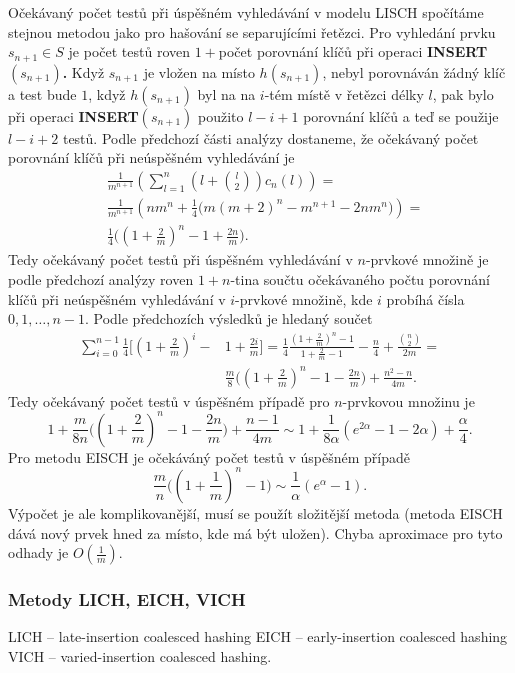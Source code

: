 \documentclass[a4paper,12pt]{article}
\begin{document}
Očekávaný počet testů při úspěšném 
vyhledávání v modelu LISCH spočítáme stejnou meto\-dou jako 
pro hašování se separujícími řetězci.  Pro vyhledání prvku 
$s_{n+1}\in S$ je počet testů roven $1+$počet porovnání 
klíčů při operaci {\bf INSERT$(s_{n+1})$.}  Když $
s_{n+1}$ je vložen 
na místo $h(s_{n+1})$, nebyl porovnáván žádný klíč a test bude $
1$, 
když $h(s_{n+1})$ byl na na $i$-tém místě v řetězci délky $
l$, pak bylo 
při operaci {\bf INSERT$(s_{n+1})$} použito $l-i+1$ porovnání klíčů 
a teď se použije $l-i+2$ testů. Podle předchozí části analýzy dostaneme, že očekávaný počet 
porovnání klíčů při neúspěšném vyhledávání je 
\begin{align*}&\frac 1{m^{n+1}}(\sum_{l=1}^n(l+\binom l2)c_n(l))=\\
&\frac 1{m^{n+1}}(nm^n+\frac 14\big(m(m+2)^n-m^{n+1}-2nm^n\big))=\\
&\frac 14\big((1+\frac 2m)^n-1+\frac {2n}m\big).\end{align*}
Tedy očekávaný počet testů při úspěšném 
vy\-hledávání v $n$-prvkové množině je podle 
před\-cho\-zí analýzy 
roven $1+n$-tina součtu očekávaného počtu porovnání 
klíčů při neúspěšném vy\-hledávání v $
i$-prvkové 
množině, kde $i$ probíhá čísla $0,1,\dots,n-1$.  Podle předchozích 
výsledků je hledaný součet 
\begin{align*}\sum_{i=0}^{n-1}\frac 14\big[(1+\frac 2m)^i-&1+\frac {2i}
m\big]=\frac 14\frac {(1+\frac 2m)^n-1}{1+\frac 2m-1}-\frac n4+\frac {\binom 
n2}{2m}=\\
&\frac m8\big((1+\frac 2m)^n-1-\frac {2n}m\big)+\frac {n^2-n}{4m}
.\end{align*}
Tedy očekávaný počet testů v úspěšném 
případě pro $n$-prvko\-vou množinu je 
$$1+\frac m{8n}\big((1+\frac 2m)^n-1-\frac {2n}m\big)+\frac {n-1}{
4m}\sim 1+\frac 1{8\alpha}(e^{2\alpha}-1-2\alpha )+\frac {\alpha}
4.$$
Pro metodu EISCH je očekáváný počet testů v 
úspěšném přípa\-dě 
$$\frac mn\big((1+\frac 1m)^n-1\big)\sim\frac 1{\alpha}(e^{\alpha}
-1).$$
Výpočet je ale komplikovanější, musí se použít složitější metoda (metoda EISCH dává nový prvek hned za místo, kde má být uložen). Chyba aproximace 
pro tyto odhady je $O(\frac 1m)$. 

\subsubsection{Metody LICH, EICH, VICH}

\phantom{---}LICH -- late-insertion coalesced hashing\newline 
\phantom{---}EICH -- early-insertion coalesced hashing\newline 
\phantom{---}VICH -- varied-insertion coalesced hashing.
\end{document}
